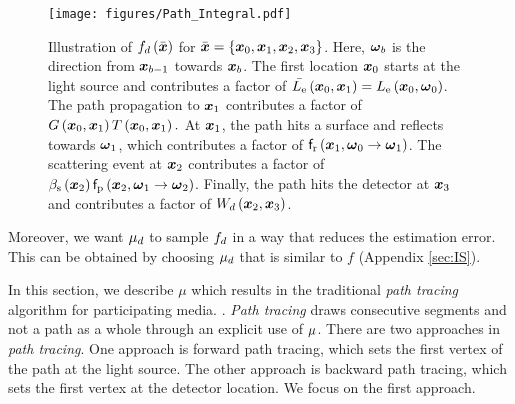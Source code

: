 \documentclass{article}
\begin{document}
\begin{figure*}[t]
  \centering
  \texttt{[image: figures/Path\_Integral.pdf]}
    \caption{Illustration of $f_{d}\left({\Bar{\boldsymbol{x}}}\right)$ for $\Bar{\boldsymbol{x}}=\left\{ {\boldsymbol{x}_0,\boldsymbol{x}_1,\boldsymbol{x}_2,\boldsymbol{x}_3}\right\}$. Here, $\boldsymbol{\omega}_{b}$ is the direction from $\boldsymbol{x}_{b-1}$ towards $\boldsymbol{x}_{b}$. The first location $\boldsymbol{x}_0$ starts at the light source and contributes a factor of $\Bar{L_{\text{e}}}\left({\boldsymbol{x}_0,\boldsymbol{x}_1}\right)=L_{\text{e}}\left({\boldsymbol{x}_0,\boldsymbol{\omega}_0}\right)$. The path propagation to $\boldsymbol{x}_1$ contributes a factor of $G\left({\boldsymbol{x}_0,\boldsymbol{x}_1}\right)T\left({{\boldsymbol{x}_0},{\boldsymbol{x}_1}}\right).$ At $\boldsymbol{x}_1$, the path hits a surface and reflects towards $\boldsymbol{\omega}_1$, which contributes a factor of $\mathsf{f}_{\text{r}}\left({\boldsymbol{x}_1,\boldsymbol{\omega}_0\rightarrow\boldsymbol{\omega}_1}\right)$. The scattering event at $\boldsymbol{x}_2$ contributes a factor of $\beta_{\text{s}}\left({\boldsymbol{x}_2}\right)\mathsf{f}_{\text{p}}\left({\boldsymbol{x}_2,\boldsymbol{\omega}_1\rightarrow\boldsymbol{\omega}_2}\right)$. Finally, the path hits the detector at $\boldsymbol{x}_{3}$ and contributes a factor of $W_{d}\left({\boldsymbol{x}_2,\boldsymbol{x}_3}\right)$. }
    \label{fig:path_integral}
\end{figure*}
Moreover, we want $\mu_{d}$ to sample $f_{d}$ in a way that reduces the estimation error. This can be obtained by choosing $\mu_{d}$ that is similar to $f$ (Appendix \ref{sec:IS}). 

In this section, we describe $\mu$ which results in the traditional {\em path tracing} algorithm for participating media. \citep{veach1997robust}. {\em Path tracing} draws consecutive segments and not a path as a whole through an explicit use of $\mu$.
There are two approaches in {\em path tracing}. One approach is forward path tracing, which sets the first vertex of the path at the light source. The other approach is backward path tracing, which sets the first vertex at the detector location. We focus on the first approach.  
\end{document}

